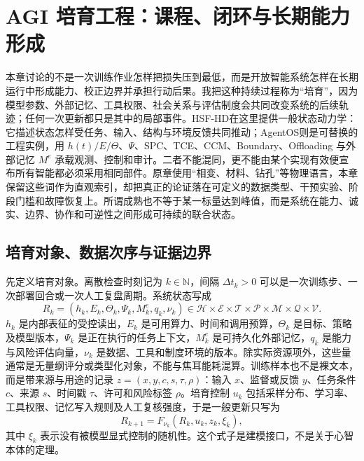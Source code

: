 \chapter{AGI 培育工程：课程、闭环与长期能力形成}
\label{chap:agi_cultivation}

本章讨论的不是一次训练作业怎样把损失压到最低，而是开放智能系统怎样在长期运行中形成能力、校正边界并承担行动后果。我把这种持续过程称为“培育”，因为模型参数、外部记忆、工具权限、社会关系与评估制度会共同改变系统的后续轨迹；任何一次更新都只是其中的局部事件。HSF-HD在这里提供一般状态动力学：它描述状态怎样受任务、输入、结构与环境反馈共同推动；AgentOS则是可替换的工程实例，用 $h(t)/E/\Theta$、$\Psi$、SPC、TCE、CCM、Boundary、Offloading 与外部记忆 $M^e$ 承载观测、控制和审计。二者不能混同，更不能由某个实现有效便宣布所有智能都必须采用相同部件。原章使用“相变、材料、钻孔”等物理语言，本章保留这些词作为直观索引，却把真正的论证落在可定义的数据类型、干预实验、阶段门槛和故障恢复上。所谓成熟也不等于某一标量达到峰值，而是系统在能力、诚实、边界、协作和可逆性之间形成可持续的联合状态。

\section{培育对象、数据次序与证据边界}
\label{sec:adiabatic_paving_and_nert_spectrometer}

先定义培育对象。离散检查时刻记为 $k\in\mathbb N$，间隔 $\Delta t_k>0$ 可以是一次训练步、一次部署回合或一次人工复盘周期。系统状态写成
\begin{equation}
R_k=(h_k,E_k,\Theta_k,\Psi_k,M^e_k,q_k,\nu_k)\in
\mathcal H\times\mathcal E\times\mathcal T\times\mathcal P\times\mathcal M\times\mathcal Q\times\mathcal V .
\end{equation}
$h_k$ 是内部表征的受控读出，$E_k$ 是可用算力、时间和调用预算，$\Theta_k$ 是目标、策略及模型版本，$\Psi_k$ 是正在执行的任务上下文，$M^e_k$ 是可持久化外部记忆，$q_k$ 是能力与风险评估向量，$\nu_k$ 是数据、工具和制度环境的版本。除实际资源项外，这些量通常是无量纲评分或类型化对象，不能与焦耳能耗混算。训练样本也不是裸文本，而是带来源与用途的记录 $z=(x,y,c,s,\tau,\rho)$：输入 $x$、监督或反馈 $y$、任务条件 $c$、来源 $s$、时间戳 $\tau$、许可和风险标签 $\rho$。培育控制 $u_k$ 包括采样分布、学习率、工具权限、记忆写入规则及人工复核强度，于是一般更新只写为
\begin{equation}
R_{k+1}=F_{\nu_k}(R_k,u_k,z_k,\xi_k),
\end{equation}
其中 $\xi_k$ 表示没有被模型显式控制的随机性。这个式子是建模接口，不是关于心智本体的定理。

